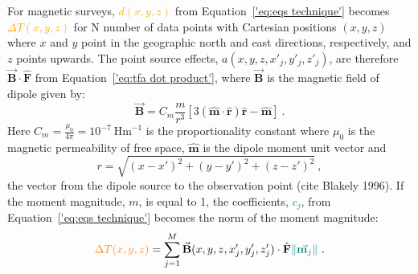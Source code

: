 For magnetic surveys, \textcolor{orange}{$d (x, y, z)$} from Equation~\ref{'eq:eqs technique'} becomes \textcolor{orange}{$\Delta T(x, y, z)$} for N number of data points with Cartesian positions $(x, y, z)$ where $x$ and $y$ point in the geographic north and east directions, respectively, and $z$ points upwards. The point source effects, $a(x, y, z, x'_j, y'_j , z'_j)$, are therefore $\vec{\mathbf{B}} \cdot \hat{\mathbf{F}}$ from Equation~\ref{'eq:tfa dot product'}, where $\vec{\mathbf{B}}$ is the magnetic field of dipole given by:
\begin{equation}
    \vec{\mathbf{B}} = C_m \frac{m}{r^3} [3 ( \hat{\mathbf{m}} \cdot \hat{\mathbf{r}}) \hat{\mathbf{r}} - \hat{\mathbf{m}}]
    \ .
\end{equation}
\noindent
Here $C_m = \frac{\mu_0}{4 \pi} = 10^{-7} \ \text{Hm}^{-1}$ is the proportionality constant where $\mu_0$ is the magnetic permeability of free space, $\hat{\mathbf{m}}$ is the dipole moment unit vector and
\begin{equation}
    r = \sqrt{(x - x')^2 + (y - y')^2 + (z - z')^2}
    \ ,
\end{equation}
the vector from the dipole source to the observation point (cite Blakely 1996). If the moment magnitude, $m$, is equal to 1, the coefficients, \textcolor{teal}{$c_j$}, from Equation~\ref{'eq:eqs technique'} becomes the norm of the moment magnitude:
\begin{equation}
\label{'eq:tfa_eqs'}
\textcolor{orange}{\Delta T (x, y, z)} = \sum_{j=1}^{M}  \vec{\mathbf{B}}(x, y, z, x'_j, y'_j, z'_j) \cdot \hat{\mathbf{F}} \textcolor{teal}{\left\lVert \vec{\mathbf{m}_j} \right\rVert}
\ .
\end{equation}


